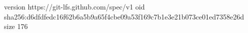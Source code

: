 version https://git-lfs.github.com/spec/v1
oid sha256:d6dfdfedc16f62b6a5b9a65f4cbe09a53f169c7b1e3e21b073ce01ed7358e26d
size 176
